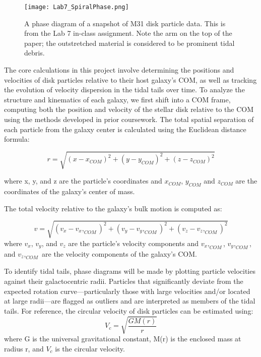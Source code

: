 \documentclass[fleqn,usenatbib]{mnras}
\begin{document}
\begin{figure}
    \centering
    \texttt{[image: Lab7\_SpiralPhase.png]}
    \caption{A phase diagram of a snapshot of M31 disk particle data. This is from the Lab 7 in-class assignment. Note the arm on the top of the paper; the outstretched material is considered to be prominent tidal debris.}
    \label{fig:enter-label}
\end{figure}

The core calculations in this project involve determining the positions and velocities of disk particles relative to their host galaxy's COM, as well as tracking the evolution of velocity dispersion in the tidal tails over time. To analyze the structure and kinematics of each galaxy, we first shift into a COM frame, computing both the position and velocity of the stellar disk relative to the COM using the methods developed in prior coursework. The total spatial separation of each particle from the galaxy center is calculated using the Euclidean distance formula:

\begin{equation}
    r = \sqrt{(x-x_{COM})^2 + (y-y_{COM})^2+ (z-z_{COM})^2}  
\end{equation}

where x,  y, and z are the particle’s coordinates and $x_{COM}$, $y_{COM}$ and $z_{COM}$ are the coordinates of the galaxy’s center of mass.

The total velocity relative to the galaxy's bulk motion is computed as:

\begin{equation}
    v = \sqrt{(v_x-v_x,_{COM})^2 + (v_y-v_y,_{COM})^2+ (v_z-v_z,_{COM})^2}  
\end{equation}
where $v_x$, $v_y$, and $v_z$ are the particle’s velocity components and $v_x,_{COM}$,  $v_y,_{COM}$, and $v_z,_{COM}$ are the velocity components of the galaxy’s COM. 

To identify tidal tails, phase diagrams will be made by plotting particle velocities against their galactocentric radii. Particles that significantly deviate from the expected rotation curve—particularly those with large velocities and/or located at large radii—are flagged as outliers and are interpreted as members of the tidal tails. For reference, the circular velocity of disk particles can be estimated using:
\begin{equation}
    V_c=\sqrt{\frac{GM(r)}{r}}
\end{equation}
where G is the universal gravitational constant, M(r) is the enclosed mass at radius r, and $V_c$ is the circular velocity. 
\end{document}
